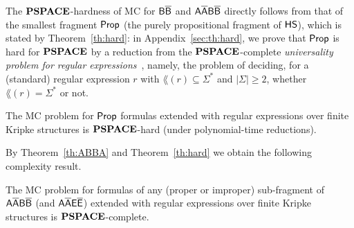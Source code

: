 
The $\textbf{PSPACE}$-hardness of MC for $\mathsf{B}\mathsf{\overline{B}}$ and 
$\mathsf{A\overline{A}B\overline{B}}$ directly follows from that of the smallest fragment $\mathsf{Prop}$ (the purely propositional fragment of $\text{\sffamily HS}$), which is stated by Theorem~\ref{th:hard}: in Appendix~\ref{sec:th:hard}, we prove that $\mathsf{Prop}$ is hard for $\textbf{PSPACE}$ by a reduction from the $\textbf{PSPACE}$-complete \emph{universality problem for regular expressions}~\cite{Garey79}, namely, the problem of deciding, for a (standard) regular expression $r$ with $\lang(r) \subseteq \Sigma^*$ and $|\Sigma|\geq 2$, whether $\lang(r)=\Sigma^*$ or not.

\begin{theorem}\label{th:hard}
The MC problem for $\mathsf{Prop}$ formulas extended with regular expressions over finite Kripke structures is $\textbf{PSPACE}$-hard (under polynomial-time reductions).
\end{theorem}

By Theorem~\ref{th:ABBA} and Theorem~\ref{th:hard} we obtain the following complexity result.
%
\begin{theorem}\label{th:glob}
The MC problem for formulas of any (proper or improper) sub-fragment of $\mathsf{A\overline{A}B\overline{B}}$ (and $\mathsf{A\overline{A}E\overline{E}}$) extended with regular expressions over finite Kripke structures is $\textbf{PSPACE}$-complete.
\end{theorem}